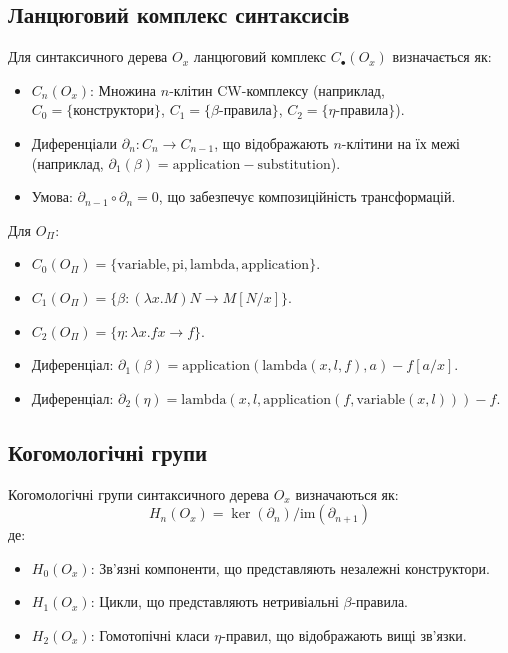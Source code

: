 \subsection{Ланцюговий комплекс синтаксисів}
\begin{definition}
Для синтаксичного дерева \( O_x \) ланцюговий комплекс \( C_\bullet(O_x) \) визначається як:
\begin{itemize}
    \item \( C_n(O_x) \): Множина \( n \)-клітин CW-комплексу (наприклад, \( C_0 = \{\text{конструктори}\} \), \( C_1 = \{\beta\text{-правила}\} \), \( C_2 = \{\eta\text{-правила}\} \)).
    \item Диференціали \( \partial_n: C_n \to C_{n-1} \), що відображають \( n \)-клітини на їх межі (наприклад, \( \partial_1(\beta) = \text{application} - \text{substitution} \)).
    \item Умова: \( \partial_{n-1} \circ \partial_n = 0 \), що забезпечує композиційність трансформацій.
\end{itemize}
\end{definition}

\begin{example}
Для \( O_\Pi \):
\begin{itemize}
    \item \( C_0(O_\Pi) = \{\text{variable}, \text{pi}, \text{lambda}, \text{application}\} \).
    \item \( C_1(O_\Pi) = \{\beta: (\lambda x. M) N \to M[N/x]\} \).
    \item \( C_2(O_\Pi) = \{\eta: \lambda x. f x \to f\} \).
    \item Диференціал: \( \partial_1(\beta) = \text{application}(\text{lambda}(x, l, f), a) - f[a/x] \).
    \item Диференціал: \( \partial_2(\eta) = \text{lambda}(x, l, \text{application}(f, \text{variable}(x, l))) - f \).
\end{itemize}
\end{example}

\subsection{Когомологічні групи}
\begin{definition}
Когомологічні групи синтаксичного дерева \( O_x \) визначаються як:
\[
H_n(O_x) = \ker(\partial_n) / \text{im}(\partial_{n+1})
\]
де:
\begin{itemize}
    \item \( H_0(O_x) \): Зв’язні компоненти, що представляють незалежні конструктори.
    \item \( H_1(O_x) \): Цикли, що представляють нетривіальні \(\beta\)-правила.
    \item \( H_2(O_x) \): Гомотопічні класи \(\eta\)-правил, що відображають вищі зв’язки.
\end{itemize}
\end{definition}

